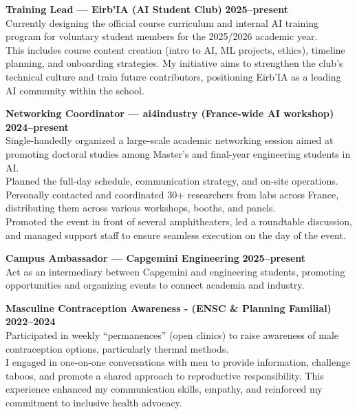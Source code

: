 \documentclass[10pt, letterpaper]{article}
\begin{document}
\vspace{0.3cm}

\textbf{Training Lead — Eirb’IA (AI Student Club)} \hfill \textbf{2025–present} \\
Currently designing the official course curriculum and internal AI training program for voluntary student members for the 2025/2026 academic year.\\
This includes course content creation (intro to AI, ML projects, ethics), timeline planning, and onboarding strategies. My initiative aims to strengthen the club’s technical culture and train future contributors, positioning Eirb’IA as a leading AI community within the school.

\vspace{0.3cm}

\textbf{Networking Coordinator — ai4industry (France-wide AI workshop)} \hfill \textbf{2024–present} \\
Single-handedly organized a large-scale academic networking session aimed at promoting doctoral studies among Master's and final-year engineering students in AI.\\
Planned the full-day schedule, communication strategy, and on-site operations. Personally contacted and coordinated 30+ researchers from labs across France, distributing them across various workshops, booths, and panels. \\
Promoted the event in front of several amphitheaters, led a roundtable discussion, and managed support staff to ensure seamless execution on the day of the event.

\vspace{0.3cm}

\textbf{Campus Ambassador — Capgemini Engineering} \hfill \textbf{2025–present} \\
Act as an intermediary between Capgemini and engineering students, promoting opportunities and organizing events to connect academia and industry.

\vspace{0.3cm}
\textbf{Masculine Contraception Awareness - (ENSC \& Planning Familial)} \hfill \textbf{2022–2024} \\
Participated in weekly “permanences” (open clinics) to raise awareness of male contraception options, particularly thermal methods. \\
I engaged in one-on-one conversations with men to provide information, challenge taboos, and promote a shared approach to reproductive responsibility. This experience enhanced my communication skills, empathy, and reinforced my commitment to inclusive health advocacy.
\end{document}
